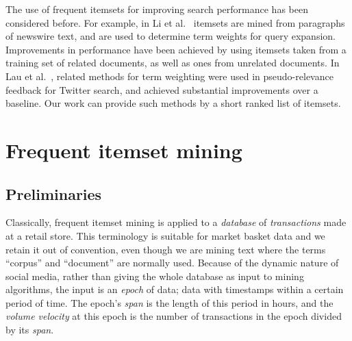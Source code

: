 \documentclass[letterpaper,12pt,titlepage,oneside,final]{book}
\begin{document}
The use of frequent itemsets for improving search performance has been considered before. 
For example, in Li et al.~\cite{li2010mining} itemsets are mined from
paragraphs of newswire text, and are used to determine term weights for query
expansion.
Improvements in performance have been achieved by using itemsets taken from
a training set of related documents, as well as ones from unrelated documents.
In Lau et al.~\cite{laumicroblog}, related methods for term weighting were
used in pseudo-relevance feedback for Twitter search,
and achieved substantial improvements over a baseline.
Our work can provide such methods by a short ranked list of itemsets.


\section{Frequent itemset mining}
\label{sec:fim}
\subsection{Preliminaries}
Classically, frequent itemset mining is applied to a \emph{database} of
\emph{transactions} made at a retail store.
This terminology is suitable for market basket data and we retain it out of
convention, even though we are mining text where the terms ``corpus'' and
``document'' are normally used.
Because of the dynamic nature of social media, rather than giving the whole
database as input to mining algorithms, the input is an \emph{epoch} of data;
data with timestamps within a certain period of time.
The epoch's \emph{span} is the length of this period in hours,
and the \emph{volume velocity} at this epoch is the number of transactions in the epoch
divided by its \emph{span}.
\end{document}
